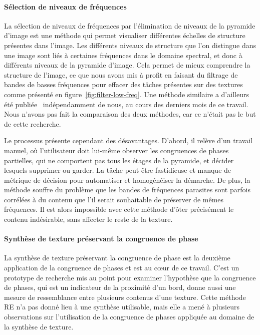 \paragraph{Sélection de niveaux de fréquences}

La sélection de niveaux de fréquences par l'élimination de niveaux de la pyramide d'image est une méthode qui permet visualiser différentes échelles de structure présentes dans l'image. Les différents niveaux de structure que l'on distingue dans une image sont liés à certaines fréquences dans le domaine spectral, et donc à différents niveaux de la pyramide d'image. Cela permet de mieux comprendre la structure de l'image, ce que nous avons mis à profit en faisant du filtrage de bandes de basses fréquences pour effacer des \og tâches \fg présentes sur des textures comme présenté en figure~\ref{fig:filter-low-freq}. Une méthode similaire a d'ailleurs été publiée~\cite{zhang_pyramid_2023} indépendamment de nous, au cours des derniers mois de ce travail. Nous n'avons pas fait la comparaison des deux méthodes, car ce n'était pas le but de cette recherche.

\bigskip

Le processus présente cependant des désavantages. D'abord, il relève d'un travail manuel, où l'utilisateur doit lui-même observer les congruences de phases partielles, qui ne comportent pas tous les étages de la pyramide, et décider lesquels supprimer ou garder. La tâche peut être fastidieuse et manque de métrique de décision pour automatiser et homogénéiser la démarche. De plus, la méthode souffre du problème que les bandes de fréquences \og parasites \fg sont parfois corrélées à du contenu que l'il serait souhaitable de préserver de mêmes fréquences. Il est alors impossible avec cette méthode d'ôter précisément le contenu indésirable, sans affecter le reste de la texture.

\paragraph{Synthèse de texture préservant la congruence de phase}

La synthèse de texture préservant la congruence de phase est la deuxième application de la congruence de phases et est au cœur de ce travail. C'est un prototype de recherche mis au point pour examiner l'hypothèse que la congruence de phases, qui est un indicateur de la proximité d'un bord, donne aussi une mesure de ressemblance entre plusieurs contenus d'une texture. Cette méthode RE n'a pas donné lieu à une synthèse utilisable, mais elle a mené à plusieurs observations sur l'utilisation de la congruence de phases appliquée au domaine de la synthèse de texture.

